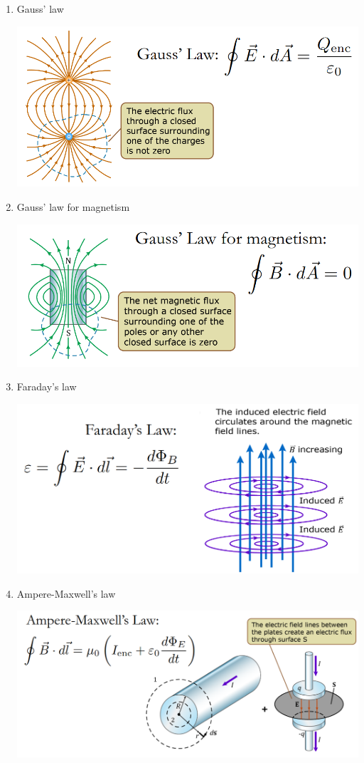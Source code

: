 \documentclass[11pt]{article}
\begin{document}
\begin{enumerate}
\item Gauss' law
\label{sec:orge76cd21}
\begin{center}
\includegraphics[width=.9\linewidth]{./images/gauss-law.png}
\end{center}
\item Gauss' law for magnetism
\label{sec:org7ba3080}
\begin{center}
\includegraphics[width=.9\linewidth]{./images/gauss-law-for-magnetism.png}
\end{center}
\item Faraday's law
\label{sec:org78bad6c}
\begin{center}
\includegraphics[width=.9\linewidth]{./images/faradays-law.png}
\end{center}
\item Ampere-Maxwell's law
\label{sec:orgd08d885}
\begin{center}
\includegraphics[width=.9\linewidth]{./images/ampere-maxwell-law.png}
\end{center}
\end{enumerate}
\end{document}
